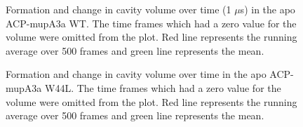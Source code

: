 \begin{singlespacing}
		\setlength\fboxsep{5pt}
		\setlength\fboxrule{1.5pt}
		\begin{figure}[htbp]
		\centering
		\caption[Formation and change in cavity volume over time (1 $ \mu $s) in the apo ACP-mupA3a WT.]{Formation and change in cavity volume over time (1 $ \mu $s) in the apo ACP-mupA3a WT. The time frames which had a zero value for the volume were omitted from the plot. Red line represents the running average over 500 frames and green line represents the mean.}
		\label{fig:CavityVolumeACPWild1000_nonzero}
		\end{figure}		

		\setlength\fboxsep{5pt}
		\setlength\fboxrule{1.5pt}
		\begin{figure}[htbp]
		\centering
		\caption[Formation and change in cavity volume over time in the apo ACP-mupA3a W44L.]{Formation and change in cavity volume over time in the apo ACP-mupA3a W44L. The time frames which had a zero value for the volume were omitted from the plot. Red line represents the running average over 500 frames and green line represents the mean.}
		\label{fig:CalvityVolumeACPMutant_nonzero}
		\end{figure}		


\end{singlespacing}
